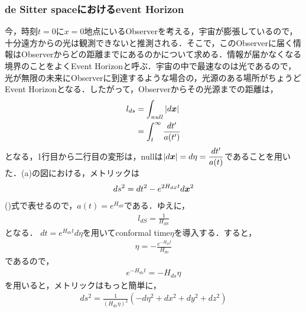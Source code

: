   \subsubsection{de Sitter spaceにおけるevent Horizon}
  今，時刻$t=0$に$x=0$地点にいるObserverを考える，宇宙が膨張しているので，十分遠方からの光は観測できないと推測される．そこで，このObserverに届く情報はObserverからどの距離までにあるのかについて求める．情報が届かなくなる境界のことをよくEvent Horizonと呼ぶ．宇宙の中で最速なのは光であるので，光が無限の未来にObserverに到達するような場合の，光源のある場所がちょうどEvent Horizonとなる．したがって，Observerからその光源までの距離は，
  \begin{align}
    l_{ds}&=\int_{null}|d\mbox{\boldmath$x$}|\\
    &=\int^{\infty}_{t}\frac{dt^{\prime}}{a(t^{\prime})}
  \end{align}
となる，1行目から二行目の変形は，nullは$|d\mbox{\boldmath$x$}|=d\eta=\dfrac{dt^{\prime}}{a(t)}$であることを用いた．(a)の図における，メトリックは
\begin{align}
  ds^2=dt^2-e^{2H_{dS}t}d\mbox{\boldmath$x$}^2
\end{align}
()式で表せるので，$a(t)=e^{H_{dS}}$である．ゆえに，
\begin{align}
  l_{dS}=\frac{1}{H_{dS}}
\end{align}
となる．
$dt=e^{H_{ds}t}d\eta$を用いてconformal time$\eta$を導入する．すると，
\begin{align}
  \eta=-\frac{e^{-H_{ds}t}}{H_{ds}}
\end{align}
であるので，
\begin{align}
  e^{-H_{ds}t}=-H_{ds}\eta
\end{align}
を用いると，メトリックはもっと簡単に，
\begin{align}
  ds^2=\frac{1}{(H_{ds}\eta)^2}(-d\eta^2+dx^2+dy^2+dz^2)
\end{align}
